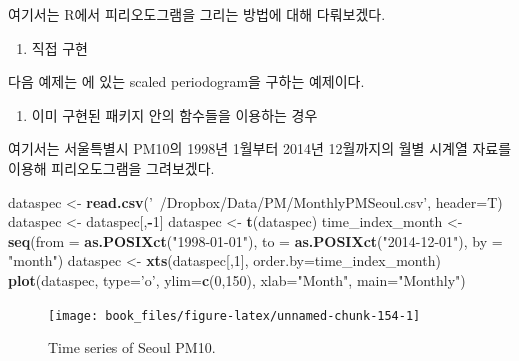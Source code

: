 \documentclass[b5paper,]{scrbook}
\makeatletter
\newenvironment{Shaded}{\begin{snugshade}}{\end{snugshade}}
\newcommand{\KeywordTok}[1]{\textcolor[rgb]{0.13,0.29,0.53}{\textbf{#1}}}
\newcommand{\DataTypeTok}[1]{\textcolor[rgb]{0.13,0.29,0.53}{#1}}
\newcommand{\DecValTok}[1]{\textcolor[rgb]{0.00,0.00,0.81}{#1}}
\newcommand{\StringTok}[1]{\textcolor[rgb]{0.31,0.60,0.02}{#1}}
\newcommand{\OperatorTok}[1]{\textcolor[rgb]{0.81,0.36,0.00}{\textbf{#1}}}
\newcommand{\NormalTok}[1]{#1}
\providecommand{\tightlist}{%
  \setlength{\itemsep}{0pt}\setlength{\parskip}{0pt}}
\theoremstyle{plain}
\theoremstyle{definition}
\numberwithin{equation}{section}
\newenvironment{kframe}{%
\medskip{}
\setlength{\fboxsep}{.8em}
 \def\at@end@of@kframe{}%
 \ifinner\ifhmode%
  \def\at@end@of@kframe{\end{minipage}}%
  \begin{minipage}{\columnwidth}%
 \fi\fi%
 \def\FrameCommand##1{\hskip\@totalleftmargin \hskip-\fboxsep
 \colorbox{shadecolor}{##1}\hskip-\fboxsep
     \hskip-\linewidth \hskip-\@totalleftmargin \hskip\columnwidth}%
 \MakeFramed {\advance\hsize-\width
   \@totalleftmargin\z@ \linewidth\hsize
   \@setminipage}}%
 {\par\unskip\endMakeFramed%
 \at@end@of@kframe}
\renewenvironment{Shaded}{\begin{kframe}}{\end{kframe}}
\makeatother
\begin{document}
여기서는 R에서 피리오도그램을 그리는 방법에 대해 다뤄보겠다.

\begin{enumerate}
\def\labelenumi{\arabic{enumi}.}
\tightlist
\item
  직접 구현
\end{enumerate}

다음 예제는 \citep{Shumway2010}에 있는 scaled periodogram을 구하는
예제이다.

\begin{enumerate}
\def\labelenumi{\arabic{enumi}.}
\setcounter{enumi}{1}
\tightlist
\item
  이미 구현된 패키지 안의 함수들을 이용하는 경우
\end{enumerate}

여기서는 서울특별시 PM10의 1998년 1월부터 2014년 12월까지의 월별 시계열
자료를 이용해 피리오도그램을 그려보겠다.

\begin{Shaded}
\begin{Highlighting}[]
\NormalTok{dataspec <-}\StringTok{ }\KeywordTok{read.csv}\NormalTok{(}\StringTok{'~/Dropbox/Data/PM/MonthlyPMSeoul.csv'}\NormalTok{, }\DataTypeTok{header=}\NormalTok{T)}
\NormalTok{dataspec <-}\StringTok{ }\NormalTok{dataspec[,}\OperatorTok{-}\DecValTok{1}\NormalTok{]}
\NormalTok{dataspec <-}\StringTok{ }\KeywordTok{t}\NormalTok{(dataspec)}
\NormalTok{time_index_month <-}\StringTok{ }\KeywordTok{seq}\NormalTok{(}\DataTypeTok{from =} \KeywordTok{as.POSIXct}\NormalTok{(}\StringTok{"1998-01-01"}\NormalTok{), }\DataTypeTok{to =} \KeywordTok{as.POSIXct}\NormalTok{(}\StringTok{"2014-12-01"}\NormalTok{), }\DataTypeTok{by =} \StringTok{"month"}\NormalTok{)}
\NormalTok{dataspec <-}\StringTok{ }\KeywordTok{xts}\NormalTok{(dataspec[,}\DecValTok{1}\NormalTok{], }\DataTypeTok{order.by=}\NormalTok{time_index_month)}
\KeywordTok{plot}\NormalTok{(dataspec, }\DataTypeTok{type=}\StringTok{'o'}\NormalTok{, }\DataTypeTok{ylim=}\KeywordTok{c}\NormalTok{(}\DecValTok{0}\NormalTok{,}\DecValTok{150}\NormalTok{), }\DataTypeTok{xlab=}\StringTok{"Month"}\NormalTok{, }\DataTypeTok{main=}\StringTok{"Monthly"}\NormalTok{)}
\end{Highlighting}
\end{Shaded}

\begin{figure}

{\centering \texttt{[image: book\_files/figure-latex/unnamed-chunk-154-1]} 

}

\caption{Time series of Seoul PM10.}\label{fig:unnamed-chunk-154}
\end{figure}
\end{document}
